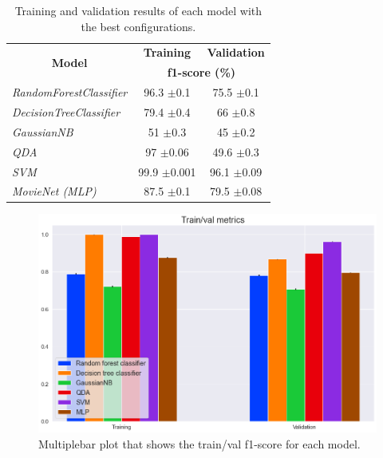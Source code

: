 \documentclass[../main]{subfiles}
\begin{document}
\begin{table}[!ht]
    \center
    \begin{tabular}{|l|cc|}
        \hline
        \multicolumn{1}{|c|}{\multirow{2}{*}{\textbf{Model}}} & \multicolumn{1}{c|}{\textbf{Training}} & \multicolumn{1}{l|}{\textbf{Validation}} \\
        \cline{2-3} 
        \multicolumn{1}{|c|}{}                                & \multicolumn{2}{c|}{\textbf{f1-score (\%)}}                                       \\
        \hline
        \textit{RandomForestClassifier}                       & \multicolumn{1}{c|}{96.3 $\pm$0.1}         & 75.5 $\pm$0.1                               \\
        \hline
        \textit{DecisionTreeClassifier}                       & \multicolumn{1}{c|}{79.4 $\pm$0.4}        & 66 $\pm$0.8                                \\
        \hline
        \textit{GaussianNB}                                   & \multicolumn{1}{c|}{51 $\pm$0.3}         & 45 $\pm$0.2                                \\
        \hline
        \textit{QDA}                                          & \multicolumn{1}{c|}{97 $\pm$0.06}        & 49.6 $\pm$0.3                               \\
        \hline %
        \textit{SVM}                                          & \multicolumn{1}{c|}{99.9 $\pm$0.001}       & 96.1 $\pm$0.09                               \\
        \hline
        \textit{MovieNet (MLP)}                               & \multicolumn{1}{c|}{87.5 $\pm$0.1}         & 79.5 $\pm$0.08                               \\
        \hline
    \end{tabular}
    \caption{Training and validation results of each model with the best configurations.}
    \label{table:train_val_results}
\end{table}

\begin{figure}[!ht]
    \center
    \includegraphics[width=0.8\linewidth]{figures/train_val_plot.png}
    \caption{Multiplebar plot that shows the train/val f1-score for each model.}
    \label{fig:train_val_plot}
\end{figure}
\newpage
\end{document}
